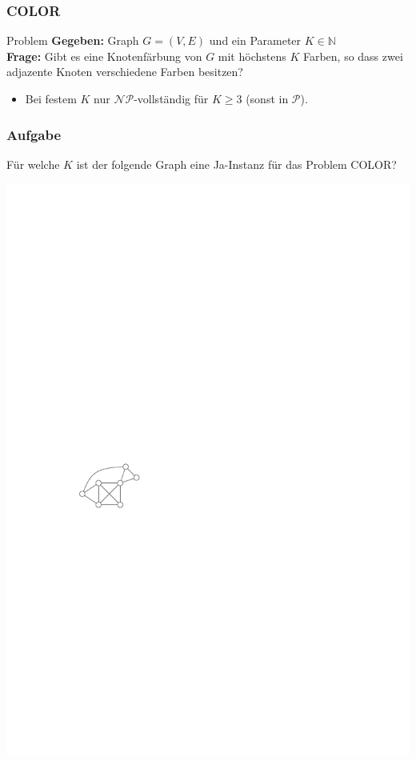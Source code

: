 \begin{frame}
\frametitle{COLOR}
\begin{block}{Problem}
\textbf{Gegeben:} Graph $G = (V, E)$ und ein Parameter $K \in \mathbb{N}$\\
\textbf{Frage:} Gibt es eine Knotenfärbung von $G$ mit höchstens $K$ Farben, so dass zwei adjazente Knoten verschiedene Farben besitzen?
\end{block}
\begin{itemize}
\item Bei festem $K$ nur $\mathcal{NP}$-vollständig für $K \geq 3$ (sonst in $\mathcal{P}$).
\end{itemize}
\end{frame}

\begin{frame}
	\frametitle{Aufgabe}
	
	Für welche $K$ ist der folgende Graph eine Ja-Instanz für das Problem COLOR?
	
	\begin{center}\includegraphics[scale=1.5]{images/tut7-graph}\end{center}
\end{frame}

